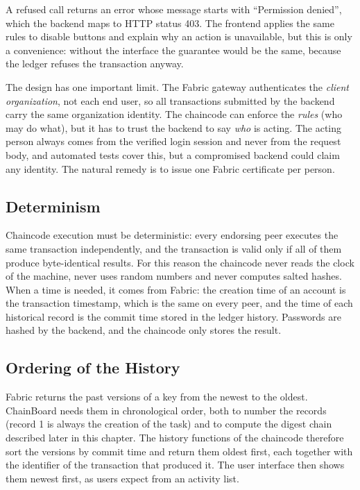A refused call returns an error whose message starts with ``Permission denied'', which the backend maps to HTTP status 403. The frontend applies the same rules to disable buttons and explain why an action is unavailable, but this is only a convenience: without the interface the guarantee would be the same, because the ledger refuses the transaction anyway.

The design has one important limit. The Fabric gateway authenticates the \emph{client organization}, not each end user, so all transactions submitted by the backend carry the same organization identity. The chaincode can enforce the \emph{rules} (who may do what), but it has to trust the backend to say \emph{who} is acting. The acting person always comes from the verified login session and never from the request body, and automated tests cover this, but a compromised backend could claim any identity. The natural remedy is to issue one Fabric certificate per person.

\subsection{Determinism}
\label{sec:determinism}

Chaincode execution must be deterministic: every endorsing peer executes the same transaction independently, and the transaction is valid only if all of them produce byte-identical results. For this reason the chaincode never reads the clock of the machine, never uses random numbers and never computes salted hashes. When a time is needed, it comes from Fabric: the creation time of an account is the transaction timestamp, which is the same on every peer, and the time of each historical record is the commit time stored in the ledger history. Passwords are hashed by the backend, and the chaincode only stores the result.

\subsection{Ordering of the History}
\label{sec:history-order}

Fabric returns the past versions of a key from the newest to the oldest. ChainBoard needs them in chronological order, both to number the records (record 1 is always the creation of the task) and to compute the digest chain described later in this chapter. The history functions of the chaincode therefore sort the versions by commit time and return them oldest first, each together with the identifier of the transaction that produced it. The user interface then shows them newest first, as users expect from an activity list.

